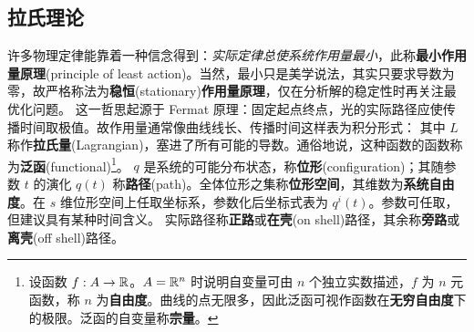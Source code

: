 \subsection{拉氏理论}\label{sec:Lag}

许多物理定律能靠着一种信念得到：\emph{实际定律总使系统作用量最小}，此称\textbf{最小作用量原理}(principle of least action)。当然，最小只是美学说法，其实只要求导数为零，故严格称法为\textbf{稳恒}(stationary)\textbf{作用量原理}，仅在分析解的稳定性时再关注最优化问题。
这一哲思起源于 Fermat 原理：固定起点终点，光的实际路径应使传播时间取极值。故作用量通常像曲线线长、传播时间这样表为积分形式：
其中 $L$ 称作\textbf{拉氏量}(Lagrangian)，塞进了所有可能的导数。通俗地说，这种函数的函数称为\textbf{泛函}(functional)\footnote{设函数 $f:A\to\mathbb{R}$。$A=\mathbb{R}^n$ 时说明自变量可由 $n$ 个独立实数描述，$f$ 为 $n$ 元函数，称 $n$ 为\textbf{自由度}。曲线的点无限多，因此泛函可视作函数在\textbf{无穷自由度}下的极限。泛函的自变量称\textbf{宗量}。}。
$q$ 是系统的可能分布状态，称\textbf{位形}(configuration)；其随参数 $t$ 的演化 $q(t)$ 称\textbf{路径}(path)。全体位形之集称\textbf{位形空间}，其维数为\textbf{系统自由度}。在 $s$ 维位形空间上任取坐标系，参数化后坐标式表为 $q^i(t)$。参数可任取，但建议具有某种时间含义。
实际路径称\textbf{正路}或\textbf{在壳}(on shell)路径，其余称\textbf{旁路}或\textbf{离壳}(off shell)路径。


